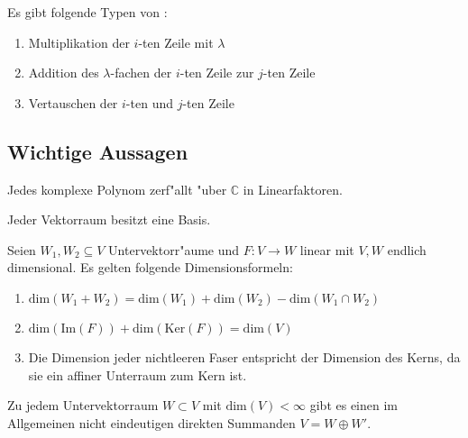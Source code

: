 \documentclass[9pt, a4paper, twocolumn, landscape]{article}
\begin{document}
\begin{definition}
Es gibt folgende Typen von :
\begin{enumerate}
\item Multiplikation der $i$-ten Zeile mit $\lambda$
\item Addition des $\lambda$-fachen der $i$-ten Zeile zur $j$-ten Zeile
\item Vertauschen der $i$-ten und $j$-ten Zeile
\end{enumerate}
\end{definition}

\subsection{Wichtige Aussagen} 

\begin{theorem} 
Jedes komplexe Polynom zerf"allt "uber $\mathbb{C}$ in Linearfaktoren.
\end{theorem}

\begin{theorem}
Jeder Vektorraum besitzt eine Basis.
\end{theorem}

\begin{theorem}
Seien $W_1, W_2 \subseteq V$ Untervektorr"aume und $F: V \rightarrow W$ linear mit $V, W$ endlich dimensional. 
Es gelten folgende Dimensionsformeln:
\begin{enumerate}
\item $\mathrm{dim}(W_1 + W_2) = \mathrm{dim}(W_1) + \mathrm{dim}(W_2) - \mathrm{dim}(W_1 \cap W_2)$
\item $\mathrm{dim}(\mathrm{Im}(F)) + \mathrm{dim}(\mathrm{Ker}(F)) = \mathrm{dim}(V)$
\item Die Dimension jeder nichtleeren Faser entspricht der Dimension des Kerns, da sie ein affiner Unterraum zum Kern ist.
\end{enumerate}
\end{theorem}

\begin{theorem}
Zu jedem Untervektorraum $W \subset V$  mit $\mathrm{dim}(V) < \infty $ gibt es einen im Allgemeinen nicht eindeutigen direkten Summanden $V = W \oplus W'$.
\end{theorem}
\end{document}
